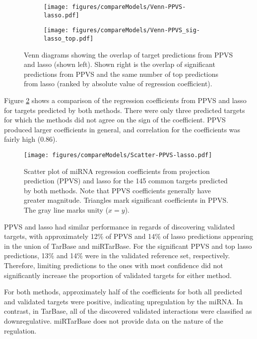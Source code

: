 \begin{figure}[!h]
  \centering
  \begin{subfigure}{.45\textwidth}
    \centering
    \texttt{[image: figures/compareModels/Venn-PPVS-lasso.pdf]}
  \end{subfigure}
  \begin{subfigure}{.45\textwidth}
    \centering
    \texttt{[image: figures/compareModels/Venn-PPVS\_sig-lasso\_top.pdf]}
  \end{subfigure}

  \caption{Venn diagrams showing the overlap of target predictions from PPVS
  and lasso (shown left). Shown right is the overlap of significant predictions
  from PPVS and the same number of top predictions from lasso (ranked by
  absolute value of regression coefficient).}
  \label{fig:venn}
\end{figure}

Figure \ref{fig:scatter-ppvs-lasso} shows a comparison of the regression
coefficients from PPVS and lasso for targets predicted by both methods. There
were only three predicted targets for which the methods did not agree on the
sign of the coefficient. PPVS produced larger coefficients in general, and
correlation for the coefficients was fairly high ($0.86$).

\begin{figure}[htb]
  \centering
  \texttt{[image: figures/compareModels/Scatter-PPVS-lasso.pdf]}
  \caption{Scatter plot of miRNA regression coefficients from projection
  prediction (PPVS) and lasso for the 145 common targets predicted by both methods.
  Note that PPVS coefficients generally have greater magnitude. Triangles
  mark significant coefficients in PPVS. The gray
  line marks unity ($x=y$).}
  \label{fig:scatter-ppvs-lasso}
\end{figure}

PPVS and lasso had similar performance in regards of discovering validated
targets, with approximately 12\% of PPVS and 14\% of lasso predictions
appearing in the union of TarBase and miRTarBase. For the significant PPVS and top lasso
predictions, 13\% and 14\% were in the validated reference set, respectively. Therefore,
limiting predictions to the ones with most confidence did not significantly increase
the proportion of validated targets for either method.

For both methods, approximately half of the coefficients for both all
predicted and validated targets were positive, indicating upregulation by the
miRNA. In contrast, in TarBase, all of the discovered validated interactions
were classified as downregulative. miRTarBase does not provide data on the
nature of the regulation.
